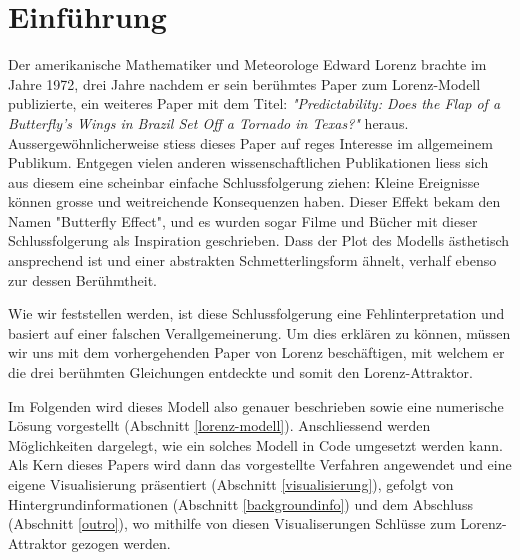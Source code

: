 
\section{Einführung}
Der amerikanische Mathematiker und Meteorologe Edward Lorenz brachte im Jahre 1972, drei Jahre nachdem er sein berühmtes Paper zum Lorenz-Modell publizierte, ein weiteres Paper mit dem Titel: \textit{"Predictability: Does the Flap of a Butterfly’s Wings in Brazil Set Off a Tornado in Texas?"} heraus. Aussergewöhnlicherweise stiess dieses Paper auf reges Interesse im allgemeinem Publikum. Entgegen vielen anderen wissenschaftlichen Publikationen liess sich aus diesem eine scheinbar einfache Schlussfolgerung ziehen: Kleine Ereignisse können grosse und weitreichende Konsequenzen haben. Dieser Effekt bekam den Namen "Butterfly Effect", und es wurden sogar Filme und Bücher mit dieser Schlussfolgerung als Inspiration geschrieben. Dass der Plot des Modells ästhetisch ansprechend ist und einer abstrakten Schmetterlingsform ähnelt, verhalf ebenso zur dessen Berühmtheit. 


Wie wir feststellen werden, ist diese Schlussfolgerung eine Fehlinterpretation und basiert auf einer falschen Verallgemeinerung. Um dies erklären zu können, müssen wir uns mit dem vorhergehenden Paper von Lorenz beschäftigen, mit welchem er die drei berühmten Gleichungen entdeckte und somit den Lorenz-Attraktor. 

Im Folgenden wird dieses Modell also genauer beschrieben sowie eine numerische Lösung vorgestellt (Abschnitt \ref{lorenz-modell}). Anschliessend werden Möglichkeiten dargelegt, wie ein solches Modell in Code umgesetzt werden kann. Als Kern dieses Papers wird dann das vorgestellte Verfahren angewendet und eine eigene Visualisierung präsentiert (Abschnitt \ref{visualisierung}), gefolgt von  Hintergrundinformationen (Abschnitt \ref{backgroundinfo}) und dem Abschluss (Abschnitt \ref{outro}), wo mithilfe von diesen Visualiserungen Schlüsse zum Lorenz-Attraktor gezogen werden. 